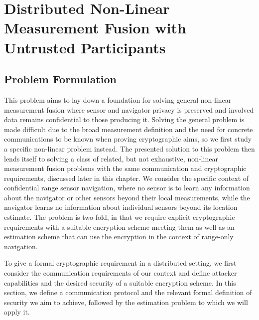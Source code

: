
\chapter{Distributed Non-Linear Measurement Fusion with Untrusted Participants}\label{ch:nonlin_fusion}

% 
%                                              
%                                              
%                                              
% 

\section{Problem Formulation}\label{sec:nonlin_fusion:problem}
This problem aims to lay down a foundation for solving general non-linear measurement fusion where sensor and navigator privacy is preserved and involved data remains confidential to those producing it. Solving the general problem is made difficult due to the broad measurement definition and the need for concrete communications to be known when proving cryptographic aims, so we first study a specific non-linear problem instead. The presented solution to this problem then lends itself to solving a class of related, but not exhaustive, non-linear measurement fusion problems with the same communication and cryptographic requirements, discussed later in this chapter. We consider the specific context of confidential range sensor navigation, where no sensor is to learn any information about the navigator or other sensors beyond their local measurements, while the navigator learns no information about individual sensors beyond its location estimate. The problem is two-fold, in that we require explicit cryptographic requirements with a suitable encryption scheme meeting them as well as an estimation scheme that can use the encryption in the context of range-only navigation.

To give a formal cryptographic requirement in a distributed setting, we first consider the communication requirements of our context and define attacker capabilities and the desired security of a suitable encryption scheme. In this section, we define a communication protocol and the relevant formal definition of security we aim to achieve, followed by the estimation problem to which we will apply it.

